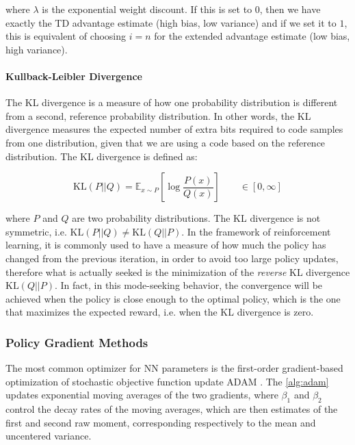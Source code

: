 where $\lambda$ is the exponential weight discount. If this is set to $0$, then we have exactly the \ac{TD} advantage estimate (high bias, low variance) and if we set it to $1$, this is equivalent of choosing $i=n$ for the extended advantage estimate (low bias, high variance).

\paragraph{Kullback-Leibler Divergence} The \ac{KL} divergence is a measure of how one probability distribution is different from a second, reference probability distribution. In other words, the \ac{KL} divergence measures the expected number of extra bits required to code samples from one distribution, given that we are using a code based on the reference distribution. The \ac{KL} divergence is defined as:

\begin{equation}
    \mathrm{KL}(P||Q) = \mathbb{E} _{x \sim P} \left[ \log \frac{P(x)}{Q(x)} \right] \qquad \in \left[0, \infty \right]
\end{equation}

where $P$ and $Q$ are two probability distributions. The \ac{KL} divergence is not symmetric, i.e. $\mathrm{KL}(P||Q) \neq \mathrm{KL}(Q||P)$. In the framework of reinforcement learning, it is commonly used to have a measure of how much the policy has changed from the previous iteration, in order to avoid too large policy updates, therefore what is actually seeked is the minimization of the \textit{reverse} \ac{KL} divergence $\mathrm{KL}(Q||P)$. In fact, in this mode-seeking behavior, the convergence will be achieved when the policy is close enough to the optimal policy, which is the one that maximizes the expected reward, i.e. when the \ac{KL} divergence is zero.

\subsubsection{Policy Gradient Methods}

The most common optimizer for \ac{NN} parameters is the first-order gradient-based optimization of stochastic objective function update ADAM \citep{kingma_adam_2017}. The \cref{alg:adam}
updates exponential moving averages of the two gradients, where $\beta_1$ and $\beta_2$ control the decay rates of the moving averages, which are then estimates of the first and second raw moment, corresponding respectively to the mean and uncentered variance.

